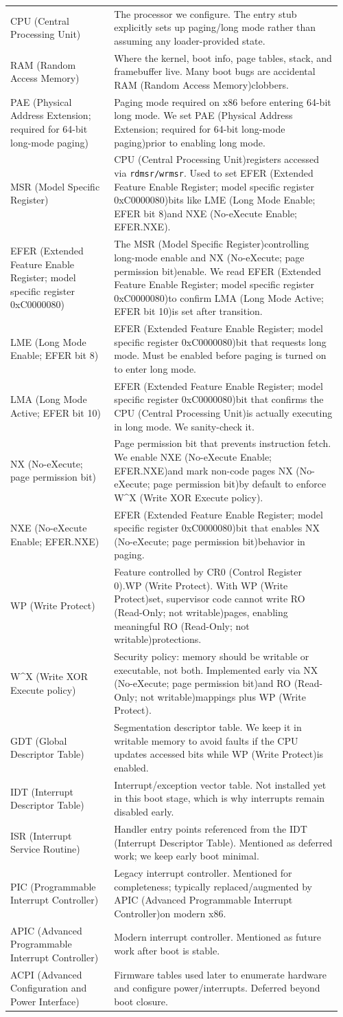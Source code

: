 \documentclass[11pt]{article}
\newcommand{\ACPI}{ACPI (Advanced Configuration and Power Interface)}
\newcommand{\APIC}{APIC (Advanced Programmable Interrupt Controller)}
\newcommand{\CPU}{CPU (Central Processing Unit)}
\newcommand{\CRzero}{CR0 (Control Register 0)}
\newcommand{\EFER}{EFER (Extended Feature Enable Register; model specific register 0xC0000080)}
\newcommand{\GDT}{GDT (Global Descriptor Table)}
\newcommand{\IDT}{IDT (Interrupt Descriptor Table)}
\newcommand{\ISR}{ISR (Interrupt Service Routine)}
\newcommand{\LMA}{LMA (Long Mode Active; EFER bit 10)}
\newcommand{\LME}{LME (Long Mode Enable; EFER bit 8)}
\newcommand{\MSR}{MSR (Model Specific Register)}
\newcommand{\NX}{NX (No-eXecute; page permission bit)}
\newcommand{\NXE}{NXE (No-eXecute Enable; EFER.NXE)}
\newcommand{\PAE}{PAE (Physical Address Extension; required for 64-bit long-mode paging)}
\newcommand{\PIC}{PIC (Programmable Interrupt Controller)}
\newcommand{\RAM}{RAM (Random Access Memory)}
\newcommand{\RO}{RO (Read-Only; not writable)}
\newcommand{\WP}{WP (Write Protect)}
\newcommand{\WX}{W\textasciicircum X (Write XOR Execute policy)}
\begin{document}
\begin{longtable}{@{}p{0.30\linewidth}p{0.66\linewidth}@{}}
\CPU & The processor we configure. The entry stub explicitly sets up paging/long mode rather than assuming any loader-provided state. \\
\RAM & Where the kernel, boot info, page tables, stack, and framebuffer live. Many boot bugs are accidental \RAM clobbers. \\
\PAE & Paging mode required on x86 before entering 64-bit long mode. We set \PAE prior to enabling long mode. \\
\MSR & \CPU registers accessed via \texttt{rdmsr/wrmsr}. Used to set \EFER bits like \LME and \NXE. \\
\EFER & The \MSR controlling long-mode enable and \NX enable. We read \EFER to confirm \LMA is set after transition. \\
\LME & \EFER bit that requests long mode. Must be enabled before paging is turned on to enter long mode. \\
\LMA & \EFER bit that confirms the \CPU is actually executing in long mode. We sanity-check it. \\
\NX & Page permission bit that prevents instruction fetch. We enable \NXE and mark non-code pages \NX by default to enforce \WX. \\
\NXE & \EFER bit that enables \NX behavior in paging. \\
\WP & Feature controlled by \CRzero.\WP. With \WP set, supervisor code cannot write \RO pages, enabling meaningful \RO protections. \\
\WX & Security policy: memory should be writable or executable, not both. Implemented early via \NX and \RO mappings plus \WP. \\
\GDT & Segmentation descriptor table. We keep it in writable memory to avoid faults if the CPU updates accessed bits while \WP is enabled. \\
\IDT & Interrupt/exception vector table. Not installed yet in this boot stage, which is why interrupts remain disabled early. \\
\ISR & Handler entry points referenced from the \IDT. Mentioned as deferred work; we keep early boot minimal. \\
\PIC & Legacy interrupt controller. Mentioned for completeness; typically replaced/augmented by \APIC on modern x86. \\
\APIC & Modern interrupt controller. Mentioned as future work after boot is stable. \\
\ACPI & Firmware tables used later to enumerate hardware and configure power/interrupts. Deferred beyond boot closure. \\

\end{longtable}
\end{document}
